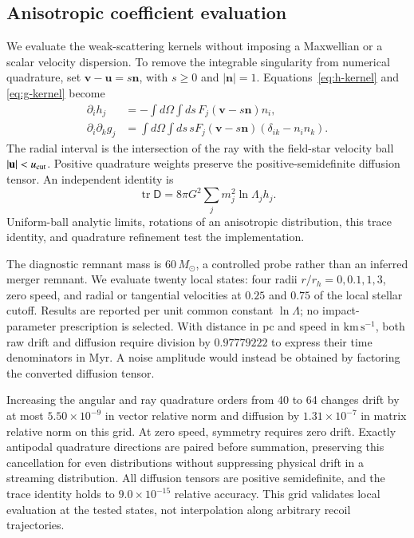 \documentclass[aps,prd,reprint,amsmath,amssymb,superscriptaddress,nofootinbib,longbibliography,floatfix]{revtex4-2}
\begin{document}
\subsection{Anisotropic coefficient evaluation}

We evaluate the weak-scattering kernels without imposing a Maxwellian or a scalar velocity dispersion. To remove the integrable singularity from numerical quadrature, set $\mathbf v-\mathbf u=s\mathbf n$, with $s\geq0$ and $|\mathbf n|=1$. Equations~\eqref{eq:h-kernel} and \eqref{eq:g-kernel} become
\begin{align}
\partial_i h_j&=-\int d\Omega\int ds\,
F_j(\mathbf v-s\mathbf n)n_i,\\
\partial_i\partial_k g_j&=\int d\Omega\int ds\,
sF_j(\mathbf v-s\mathbf n)(\delta_{ik}-n_in_k).
\label{eq:ray-quadrature}
\end{align}
The radial interval is the intersection of the ray with the field-star velocity ball $|\mathbf u|<u_{\rm cut}$. Positive quadrature weights preserve the positive-semidefinite diffusion tensor. An independent identity is
\begin{equation}
\operatorname{tr}\mathsf D=
8\pi G^2\sum_jm_j^2\ln\Lambda_j h_j.
\label{eq:diffusion-trace-check}
\end{equation}
Uniform-ball analytic limits, rotations of an anisotropic distribution, this trace identity, and quadrature refinement test the implementation.

The diagnostic remnant mass is $60\,M_\odot$, a controlled probe rather than an inferred merger remnant. We evaluate twenty local states: four radii $r/r_h=0,0.1,1,3$, zero speed, and radial or tangential velocities at $0.25$ and $0.75$ of the local stellar cutoff. Results are reported per unit common constant $\ln\Lambda$; no impact-parameter prescription is selected. With distance in pc and speed in $\mathrm{km\,s^{-1}}$, both raw drift and diffusion require division by $0.97779222$ to express their time denominators in Myr. A noise amplitude would instead be obtained by factoring the converted diffusion tensor.

Increasing the angular and ray quadrature orders from 40 to 64 changes drift by at most $5.50\times10^{-9}$ in vector relative norm and diffusion by $1.31\times10^{-7}$ in matrix relative norm on this grid. At zero speed, symmetry requires zero drift. Exactly antipodal quadrature directions are paired before summation, preserving this cancellation for even distributions without suppressing physical drift in a streaming distribution. All diffusion tensors are positive semidefinite, and the trace identity holds to $9.0\times10^{-15}$ relative accuracy. This grid validates local evaluation at the tested states, not interpolation along arbitrary recoil trajectories.
\end{document}
